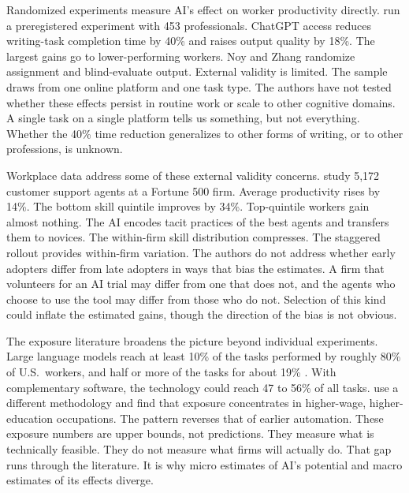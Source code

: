 \documentclass[12pt]{article}
\begin{document}
Randomized experiments measure AI's effect on worker productivity directly. \citet{noy2023} run a preregistered experiment with 453 professionals. ChatGPT access reduces writing-task completion time by 40\% and raises output quality by 18\%. The largest gains go to lower-performing workers. Noy and Zhang randomize assignment and blind-evaluate output. External validity is limited. The sample draws from one online platform and one task type. The authors have not tested whether these effects persist in routine work or scale to other cognitive domains. A single task on a single platform tells us something, but not everything. Whether the 40\% time reduction generalizes to other forms of writing, or to other professions, is unknown.

Workplace data address some of these external validity concerns. \citet{brynjolfsson2025work} study 5,172 customer support agents at a Fortune 500 firm. Average productivity rises by 14\%. The bottom skill quintile improves by 34\%. Top-quintile workers gain almost nothing. The AI encodes tacit practices of the best agents and transfers them to novices. The within-firm skill distribution compresses. The staggered rollout provides within-firm variation. The authors do not address whether early adopters differ from late adopters in ways that bias the estimates. A firm that volunteers for an AI trial may differ from one that does not, and the agents who choose to use the tool may differ from those who do not. Selection of this kind could inflate the estimated gains, though the direction of the bias is not obvious.

The exposure literature broadens the picture beyond individual experiments. Large language models reach at least 10\% of the tasks performed by roughly 80\% of U.S.\ workers, and half or more of the tasks for about 19\% \citep{eloundou2024}. With complementary software, the technology could reach 47 to 56\% of all tasks. \citet{felten2023} use a different methodology and find that exposure concentrates in higher-wage, higher-education occupations. The pattern reverses that of earlier automation. These exposure numbers are upper bounds, not predictions. They measure what is technically feasible. They do not measure what firms will actually do. That gap runs through the literature. It is why micro estimates of AI's potential and macro estimates of its effects diverge.
\end{document}
